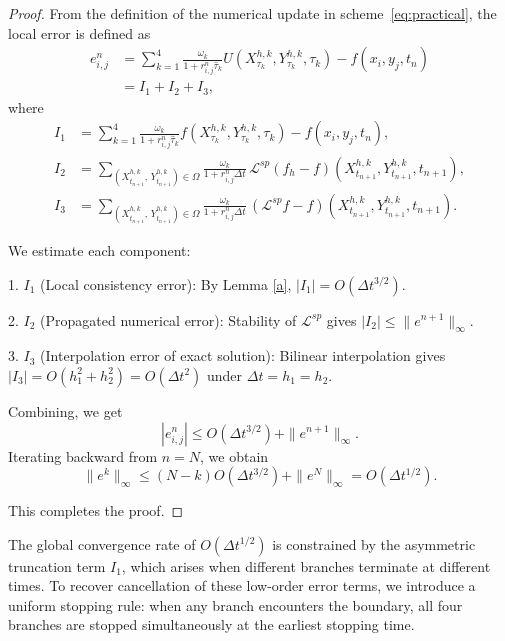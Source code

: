 \documentclass[11pt]{article}
\theoremstyle{mythm}
\theoremstyle{definition}
\begin{document}
	\begin{proof}
		From the definition of the numerical update in scheme~\eqref{eq:practical}, the local error is defined as
		\begin{equation*}
			\begin{aligned}
				e_{i,j}^n 
				&= \sum_{k=1}^4 \frac{\omega_k}{1+r_{i,j}^n \hat{\tau}_k}
				U\!\left(X_{\tau_k}^{h,k}, Y_{\tau_k}^{h,k}, \tau_k\right)
				- f(x_i, y_j, t_n) \\
				&= I_1 + I_2 + I_3,
			\end{aligned}
		\end{equation*}
		where
		\begin{equation*}
			\begin{aligned}
				I_1 &= \sum_{k=1}^4 
				\frac{\omega_k}{1+r_{i,j}^n \hat{\tau}_k}
				f\!\left(X_{\tau_k}^{h,k}, Y_{\tau_k}^{h,k}, \tau_k\right)
				- f(x_i, y_j, t_n), \\[0.3em]
				I_2 &= \sum_{(X_{t_{n+1}}^{h,k},\, Y_{t_{n+1}}^{h,k}) \in \Omega}
				\frac{\omega_k}{1+r_{i,j}^n \Delta t}\,
				\mathcal{L}^{sp}(f_h - f)\!\left(X_{t_{n+1}}^{h,k}, Y_{t_{n+1}}^{h,k}, t_{n+1}\right), \\[0.3em]
				I_3 &= \sum_{(X_{t_{n+1}}^{h,k},\, Y_{t_{n+1}}^{h,k}) \in \Omega}
				\frac{\omega_k}{1+r_{i,j}^n \Delta t}\,
				(\mathcal{L}^{sp}f - f)\!\left(X_{t_{n+1}}^{h,k}, Y_{t_{n+1}}^{h,k}, t_{n+1}\right).
			\end{aligned}
		\end{equation*}
		
		We estimate each component:
		
		1. $I_1$ (Local consistency error): By Lemma \ref{a}, $|I_1| = O(\Delta t^{3/2})$.
		
		2. $I_2$ (Propagated numerical error): Stability of $\mathcal{L}^{sp}$ gives $|I_2| \le \|e^{n+1}\|_\infty$.
		
		3. $I_3$ (Interpolation error of exact solution): Bilinear interpolation gives $|I_3| = O(h_1^2+h_2^2) = O(\Delta t^2)$ under $\Delta t = h_1 = h_2$.
		
		Combining, we get
		\[
		|e_{i,j}^n| \le O(\Delta t^{3/2}) + \|e^{n+1}\|_\infty.
		\]
		Iterating backward from $n=N$, we obtain
		\[
		\|e^k\|_\infty \le (N-k)O(\Delta t^{3/2}) + \|e^N\|_\infty = O(\Delta t^{1/2}).
		\]
		
		This completes the proof.
	\end{proof}
	The global convergence rate of $O(\Delta t^{1/2})$ is constrained by the asymmetric truncation term $I_1$, which arises when different branches terminate at different times. To recover cancellation of these low-order error terms, we introduce a uniform stopping rule: when any branch encounters the boundary, all four branches are stopped simultaneously at the earliest stopping time.
	
\end{document}
